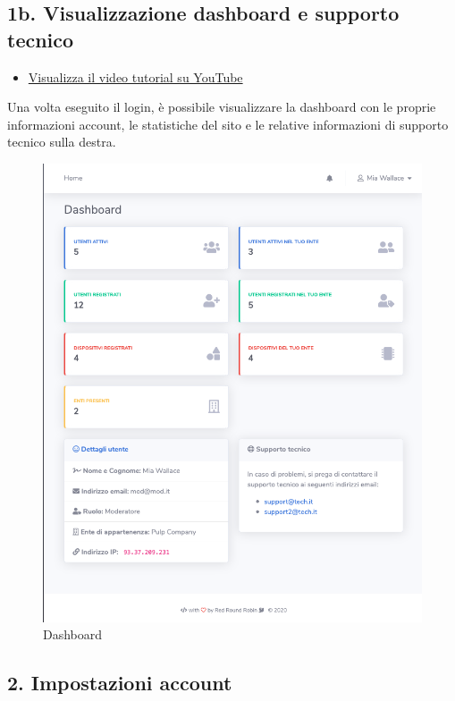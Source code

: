 \newpage \subsection{1b. Visualizzazione dashboard e supporto tecnico}
	

	\begin{itemize}
		\item \href{https://www.youtube.com/watch?v=PjySMOLCtMA&list=PLPKYjnuIh1FA3b3jn_bwY_ztYzaFn2mIT&index=3}{Visualizza il video tutorial su YouTube} 
	\end{itemize}
	Una volta eseguito il login, è possibile visualizzare la dashboard con le proprie informazioni account, le statistiche del sito e le relative informazioni di supporto tecnico sulla destra.

	\begin{figure}[H]
		\centering
		\includegraphics[scale=0.600]{res/images/membro/dashboard.png}
		\caption{Dashboard}
	\end{figure}

\newpage \subsection{2. Impostazioni account}

